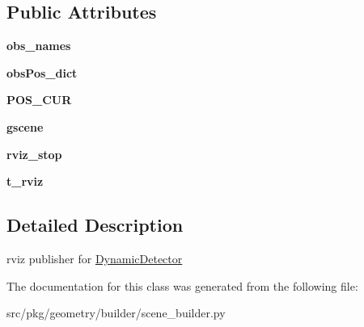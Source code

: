 \subsection*{Public Attributes}
\begin{DoxyCompactItemize}
\item 
\mbox{\label{classrnb-planning_1_1src_1_1pkg_1_1geometry_1_1builder_1_1scene__builder_1_1_rviz_publisher_a518b44f45d7e3f88a240ce45ffe5c5fe}} 
{\bfseries obs\+\_\+names}
\item 
\mbox{\label{classrnb-planning_1_1src_1_1pkg_1_1geometry_1_1builder_1_1scene__builder_1_1_rviz_publisher_a899f649198fd3aeec660ffaa15181167}} 
{\bfseries obs\+Pos\+\_\+dict}
\item 
\mbox{\label{classrnb-planning_1_1src_1_1pkg_1_1geometry_1_1builder_1_1scene__builder_1_1_rviz_publisher_a1db0e3ae44e9770f349d475f6da0dfda}} 
{\bfseries P\+O\+S\+\_\+\+C\+UR}
\item 
\mbox{\label{classrnb-planning_1_1src_1_1pkg_1_1geometry_1_1builder_1_1scene__builder_1_1_rviz_publisher_a2770d120d74f3a1f697f36d81acb4e29}} 
{\bfseries gscene}
\item 
\mbox{\label{classrnb-planning_1_1src_1_1pkg_1_1geometry_1_1builder_1_1scene__builder_1_1_rviz_publisher_a66d79845d6838b0493022886054137fe}} 
{\bfseries rviz\+\_\+stop}
\item 
\mbox{\label{classrnb-planning_1_1src_1_1pkg_1_1geometry_1_1builder_1_1scene__builder_1_1_rviz_publisher_abeb1a43e27890eded8c6a6e496c85249}} 
{\bfseries t\+\_\+rviz}
\end{DoxyCompactItemize}


\subsection{Detailed Description}
rviz publisher for \hyperlink{classrnb-planning_1_1src_1_1pkg_1_1geometry_1_1builder_1_1scene__builder_1_1_dynamic_detector}{Dynamic\+Detector} 

The documentation for this class was generated from the following file\+:\begin{DoxyCompactItemize}
\item 
src/pkg/geometry/builder/scene\+\_\+builder.\+py\end{DoxyCompactItemize}

